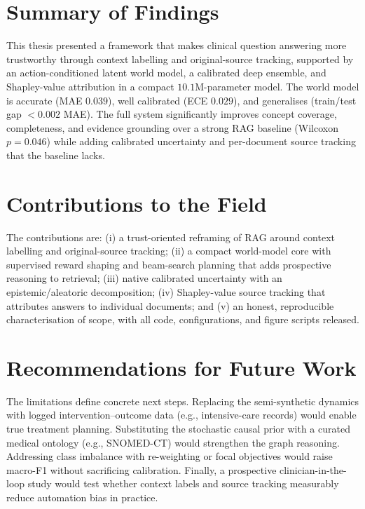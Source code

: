 \documentclass[11pt,a4paper]{report}
\begin{document}
\section{Summary of Findings}
This thesis presented a framework that makes clinical question answering more
trustworthy through context labelling and original-source tracking, supported by
an action-conditioned latent world model, a calibrated deep ensemble, and
Shapley-value attribution in a compact $10.1$M-parameter model. The world model
is accurate (MAE $0.039$), well calibrated (ECE $0.029$), and generalises (train/test
gap $<0.002$ MAE). The full system significantly improves concept coverage,
completeness, and evidence grounding over a strong RAG baseline (Wilcoxon
$p=0.046$) while adding calibrated uncertainty and per-document source tracking
that the baseline lacks.

\section{Contributions to the Field}
The contributions are: (i) a trust-oriented reframing of RAG around context
labelling and original-source tracking; (ii) a compact world-model core with
supervised reward shaping and beam-search planning that adds prospective
reasoning to retrieval; (iii) native calibrated uncertainty with an
epistemic/aleatoric decomposition; (iv) Shapley-value source tracking that
attributes answers to individual documents; and (v) an honest, reproducible
characterisation of scope, with all code, configurations, and figure scripts
released.

\section{Recommendations for Future Work}
\label{sec:future}
The limitations define concrete next steps. Replacing the semi-synthetic
dynamics with logged intervention--outcome data (e.g., intensive-care records)
would enable true treatment planning. Substituting the stochastic causal prior
with a curated medical ontology (e.g., SNOMED-CT) would strengthen the graph
reasoning. Addressing class imbalance with re-weighting or focal objectives
would raise macro-F1 without sacrificing calibration. Finally, a prospective
clinician-in-the-loop study would test whether context labels and source
tracking measurably reduce automation bias in practice.

\end{document}
